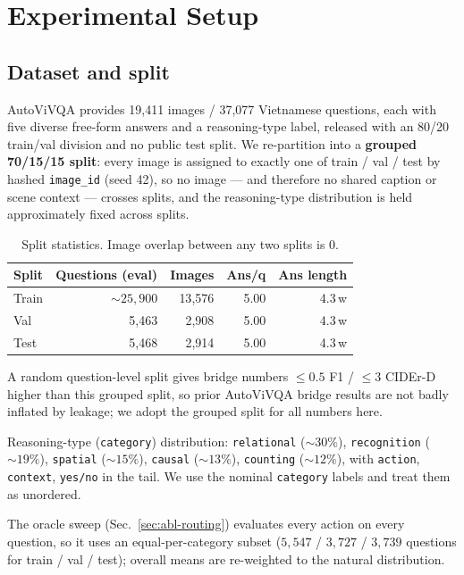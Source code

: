 \section{Experimental Setup}
\label{sec:setup}

\subsection{Dataset and split}

AutoViVQA provides 19{,}411 images / 37{,}077 Vietnamese questions, each with five
diverse free-form answers and a reasoning-type label, released with an 80/20
train/val division and no public test split. We re-partition into a
\textbf{grouped 70/15/15 split}: every image is assigned to exactly one of
train / val / test by hashed \texttt{image\_id} (seed 42), so no image --- and
therefore no shared caption or scene context --- crosses splits, and the
reasoning-type distribution is held approximately fixed across splits.

\begin{table}[t]
  \centering
  \caption{Split statistics. Image overlap between any two splits is $0$.}
  \label{tab:splits}
  \begin{tabular}{lrrrr}
    \toprule
    Split & Questions (eval) & Images & Ans/q & Ans length \\
    \midrule
    Train & ${\sim}25{,}900$ & 13{,}576 & 5.00 & 4.3\,w \\
    Val   & 5{,}463 & 2{,}908 & 5.00 & 4.3\,w \\
    Test  & 5{,}468 & 2{,}914 & 5.00 & 4.3\,w \\
    \bottomrule
  \end{tabular}
\end{table}

A random question-level split gives bridge numbers $\le 0.5$ F1 / $\le 3$ CIDEr-D
higher than this grouped split, so prior AutoViVQA bridge results are not badly
inflated by leakage; we adopt the grouped split for all numbers here.

Reasoning-type (\texttt{category}) distribution: \texttt{relational}
(${\sim}30\%$), \texttt{recognition} (${\sim}19\%$), \texttt{spatial}
(${\sim}15\%$), \texttt{causal} (${\sim}13\%$), \texttt{counting} (${\sim}12\%$),
with \texttt{action}, \texttt{context}, \texttt{yes/no} in the tail. We use the
nominal \texttt{category} labels and treat them as unordered.

The oracle sweep (Sec.~\ref{sec:abl-routing}) evaluates every action on every
question, so it uses an equal-per-category subset
($5{,}547$ / $3{,}727$ / $3{,}739$ questions for train / val / test); overall
means are re-weighted to the natural distribution.


